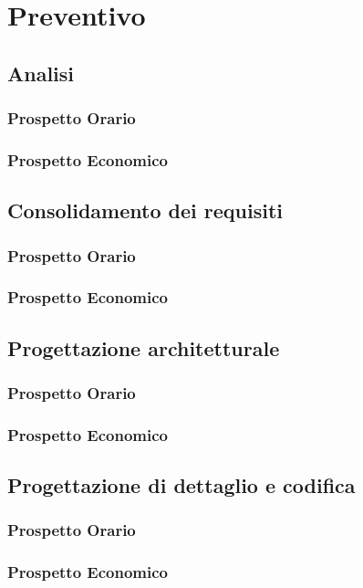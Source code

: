 \documentclass[PianoDiProgetto.tex]{subfiles}
\begin{document}
\chapter{Preventivo}

\section{Analisi}
\subsection{Prospetto Orario}
\subsection{Prospetto Economico}

\section{Consolidamento dei requisiti}
\subsection{Prospetto Orario}
\subsection{Prospetto Economico}

\section{Progettazione architetturale}
\subsection{Prospetto Orario}
\subsection{Prospetto Economico}

\section{Progettazione di dettaglio e codifica}
\subsection{Prospetto Orario}
\subsection{Prospetto Economico}
\end{document}
